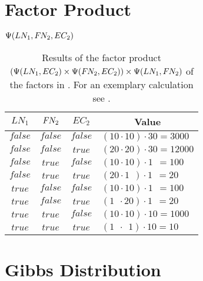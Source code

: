 \section{Factor Product}\label{app:sec-factor-product}
\begin{table}[H]
\centering
$\Psi(LN_1,F\hspace{-0.07em} N_2,EC_2)$\par
\smallskip
\begin{tabular}{c c c l}
 \toprule
 $LN_1$ & $F\hspace{-0.07em} N_2$ & $EC_2$ & \multicolumn{1}{c}{Value} \\
 \midrule
 $\mathit{false}$ & $\mathit{false}$ & $\mathit{false}$ & $(10\cdot10)\cdot30=3000$\\
 $\mathit{false}$ & $\mathit{false}$ & $\mathit{true}$  & $(20\cdot20)\cdot30=12000$\\
 $\mathit{false}$ & $\mathit{true}$  & $\mathit{false}$ & $(10\cdot10)\cdot1\ \ =100$\\
 $\mathit{false}$ & $\mathit{true}$  & $\mathit{true}$  & $(20\cdot1\ \ )\cdot1\ \ =20$\\
 $\mathit{true}$  & $\mathit{false}$ & $\mathit{false}$ & $(10\cdot10)\cdot1\ \ =100$\\
 $\mathit{true}$  & $\mathit{false}$ & $\mathit{true}$  & $(1\ \ \cdot20)\cdot1\ \ =20$\\
 $\mathit{true}$  & $\mathit{true}$  & $\mathit{false}$ & $(10\cdot10)\cdot10=1000$\\
 $\mathit{true}$  & $\mathit{true}$  & $\mathit{true}$  & $(1\ \ \cdot\ \ 1)\cdot10=10$\\
 \bottomrule
\end{tabular}
\caption{Results of the \gls{factor product} $(\Psi(LN_1,EC_2)\times\Psi(F\hspace{-0.07em} N_2,EC_2))\times\Psi(LN_1,F\hspace{-0.07em} N_2)$ of the \glspl{factor} in . For an exemplary calculation see .}
\label{tab:example-factor-product}
\end{table}
\section{Gibbs Distribution}\label{app:sec-gibbs-distribution}
